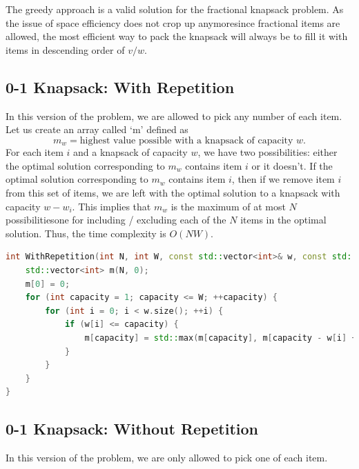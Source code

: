 \documentclass[12pt, a4paper]{article}
\theoremstyle{definition}
\theoremstyle{remark}
\begin{document}
The greedy approach is a valid solution for the fractional knapsack problem. As the issue of space efficiency does not crop up anymore\textemdash since fractional items are allowed, the most efficient way to pack the knapsack will always be to fill it with items in descending order of $v/w$.

\subsection{0-1 Knapsack: With Repetition}
In this version of the problem, we are allowed to pick any number of each item. Let us create an array called `m' defined as
\begin{equation}
    m_w = \text{highest value possible with a knapsack of capacity } w.
\end{equation}
For each item $i$ and a knapsack of capacity $w$, we have two possibilities: either the optimal solution corresponding to $m_w$ contains item $i$ or it doesn't.
If the optimal solution corresponding to $m_w$ contains item $i$, then if we remove item $i$ from this set of items, we are left with the optimal solution to a knapsack with capacity $w - w_i$. This implies that $m_w$ is the maximum of at most $N$ possibilities\textemdash one for including / excluding each of the $N$ items in the optimal solution. Thus, the time complexity is $O(NW)$.

\begin{lstlisting}[language=C++]
int WithRepetition(int N, int W, const std::vector<int>& w, const std::vector<int>& v) {
    std::vector<int> m(N, 0);
    m[0] = 0;
    for (int capacity = 1; capacity <= W; ++capacity) {
        for (int i = 0; i < w.size(); ++i) {
            if (w[i] <= capacity) {
                m[capacity] = std::max(m[capacity], m[capacity - w[i] + v[i]]);
            }
        }
    }
}
\end{lstlisting}

\subsection{0-1 Knapsack: Without Repetition}
In this version of the problem, we are only allowed to pick one of each item.
\end{document}
